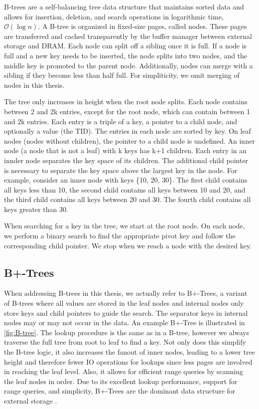 B-trees \cite{bayer1970organization} are a self-balancing tree data structure that maintains sorted data and allows for insertion, deletion, and search operations in logarithmic time, $\mathcal{O}(\log n)$.
A B-tree is organized in fixed-size pages, called nodes. These pages are transferred and cached transparently by the buffer manager between external storage and \ac{DRAM}.
Each node can split off a sibling once it is full. If a node is full and a new key needs to be inserted, the node splits into two nodes, and the middle key is promoted to the parent node.
Additionally, nodes can merge with a sibling if they become less than half full. For simpliticity, we omit merging of nodes in this thesis.

The tree only increases in height when the root node splits.
Each node contains between 2 and 2k entries, except for the root node, which can contain between 1 and 2k entries.
Each entry is a triple of a key, a pointer to a child node, and optionally a value (the \ac{TID}).
The entries in each node are sorted by key. On leaf nodes (nodes without children), the pointer to a child node is undefined.
An inner node (a node that is not a leaf) with k keys has k+1 children.
Each entry in an innder node separates the key space of its children.
The additional child pointer is necessary to separate the key space above the largest key in the node.
For example, consider an inner node with keys \{10, 20, 30\}.
The first child contains all keys less than 10, the second child contains all keys between 10 and 20, and the third child contains all keys between 20 and 30. 
The fourth child contains all keys greater than 30.

When searching for a key in the tree, we start at the root node.
On each node, we perform a binary search to find the appropriate pivot key and follow the corresponding child pointer.
We stop when we reach a node with the desired key.

\subsection*{B+-Trees}
When addressing B-trees in this thesis, we actually refer to B+-Trees, a variant of B-trees where all values are stored in the leaf nodes and internal nodes only store keys and child pointers to guide the search.
The separator keys in internal nodes may or may not occur in the data. An example B+-Tree is illustrated in \autoref{fig:B-tree}.
The lookup procedure is the same as in a B-tree, however we always traverse the full tree from root to leaf to find a key.
Not only does this simplify the B-tree logic, it also increases the fanout of inner nodes, leading to a lower tree height and therefore fewer \ac{IO} operations for lookups since less pages are involved in reaching the leaf level.
Also, it allows for efficient range queries by scanning the leaf nodes in order.
Due to its excellent lookup performance, support for range queries, and simplicity, B+-Trees are the dominant data structure for external storage \cite{mdbs2024slides}.

